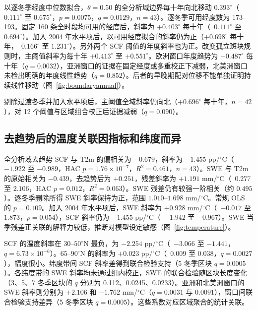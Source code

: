 以逐冬季经度中位数拟合，$\theta=0.50$ 的全分析域边界每十年向北移动 $0.393^\circ$（\CI\ $0.111^\circ$ 至 $0.675^\circ$，$p=0.0075$，$q=0.0129$，$n=43$）。逐冬季可用经度数为 173--193。固定 160 条全时段均可用的经度后，斜率为 $+0.403^\circ$ 每十年（\CI\ $0.111^\circ$ 至 $0.694^\circ$）。加入 2004 年水平项后，以可用经度拟合的斜率仍为正（$+0.698^\circ$ 每十年，\CI\ $0.166^\circ$ 至 $1.231^\circ$）。另外两个 SCF 阈值的年度斜率也为正。改变孤立斑块规则时，主阈值斜率为每十年 $+0.413^\circ$ 至 $+0.551^\circ$。欧洲窗口年度趋势为 $+0.487^\circ$ 每十年（$q=0.0032$），亚洲窗口的证据在固定经度或多重校正下减弱，北美洲窗口未检出明确的年度线性趋势（$q=0.852$）。后者的早晚期配对位移不能单独证明持续线性移动（图~\ref{fig:boundaryannual}）。


剔除过渡冬季并加入水平项后，主阈值全域斜率仍向北（$+0.696^\circ$ 每十年，$n=42$），对 12 个阈值与区域组合校正后证据减弱（$q=0.090$）。

\subsection{去趋势后的温度关联因指标和纬度而异}

全分析域去趋势 SCF 与 T2m 的偏相关为 $-0.679$，斜率为 $-1.455$ pp/$^\circ$C（\CI\ $-1.922$ 至 $-0.989$，HAC $p=1.76\times10^{-7}$，$R^2=0.461$，$n=43$）。SWE 与 T2m 的原始相关为 $-0.439$，去趋势后为 $+0.251$，残差斜率为 $+1.191$ mm/$^\circ$C（\CI\ $0.277$ 至 $2.106$，HAC $p=0.012$，$R^2=0.063$）。SWE 残差仍有较强一阶相关（约 $0.495$）。逐冬季删除所得 SWE 斜率保持为正，范围 $1.010$--$1.698$ mm/$^\circ$C。常规 OLS 的 $p=0.109$。加入 2004 年水平项后，SWE 斜率为 $+0.928$ mm/$^\circ$C（\CI\ $-0.017$ 至 $1.873$，$p=0.054$），SCF 斜率仍为 $-1.455$ pp/$^\circ$C（\CI\ $-1.942$ 至 $-0.967$）。SWE 当季残差正关联的解释力较低，推断对模型设定敏感（图~\ref{fig:temperature}）。

SCF 的温度斜率在 $30$--$50^\circ$N 最负，为 $-2.254$ pp/$^\circ$C（\CI\ $-3.066$ 至 $-1.441$，$q=6.73\times10^{-6}$）。$65$--$90^\circ$N 的斜率为 $+0.023$ pp/$^\circ$C（\CI\ $0.009$ 至 $0.038$，$q=0.0027$），幅度很小。纬度带间 SCF 斜率差得到联合检验支持（5 冬季区块 $q=0.0005$）。各纬度带的 SWE 斜率均未通过组内校正，SWE 的联合检验随区块长度变化（3、5、7 冬季区块的 $q$ 分别为 0.112、0.0245、0.0233）。亚洲和北美洲窗口的 SWE 斜率则分别为 $+2.106$ 和 $-1.762$ mm/$^\circ$C（$q=0.0031$ 与 $0.0091$），窗口间联合检验支持差异（5 冬季区块 $q=0.0005$）。这些系数对应区域聚合的统计关联。

